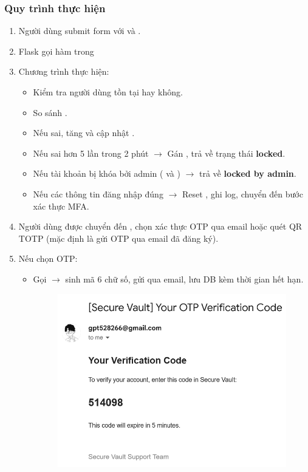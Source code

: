 \subsubsection*{Quy trình thực hiện}
\begin{enumerate}
    \item Người dùng submit form  với  và .
    \item Flask gọi hàm  trong 
    \item Chương trình thực hiện:
    \begin{itemize}
        \item Kiểm tra người dùng tồn tại hay không.
        \item So sánh .
        \item Nếu sai, tăng  và cập nhật . 
        \item Nếu sai hơn 5 lần trong 2 phút $\rightarrow$ Gán , trả về trạng thái \textbf{locked}.
        \item Nếu tài khoản bị khóa bởi admin ( và ) $\rightarrow$ trả về \textbf{locked by admin}.
        \item Nếu các thông tin đăng nhập đúng $\rightarrow$ Reset , ghi log, chuyển đến bước xác thực MFA.
    \end{itemize}
    \item Người dùng được chuyển đến , chọn xác thực OTP qua email hoặc quét QR TOTP (mặc định là gửi OTP qua email đã đăng ký).
    \item Nếu chọn OTP:
    \begin{itemize}
        \item Gọi  $\rightarrow$ sinh mã 6 chữ số, gửi qua email, lưu DB kèm thời gian hết hạn.
        \begin{figure}[H]
        \centering
        \includegraphics[scale=0.34]{img/mail-otp.png}

\end{figure}
\end{itemize}
\end{enumerate}
